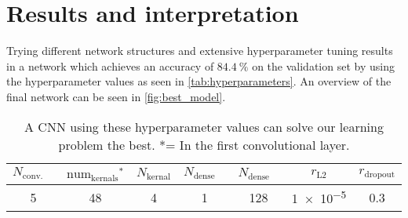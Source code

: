\section{Results and interpretation}
\label{sec:results}
Trying different network structures and extensive hyperparameter tuning results in a network which achieves an accuracy of $\SI{84.4}{\percent}$ on the validation set by using the
hyperparameter values as seen in \autoref{tab:hyperparameters}.
An overview of the final network can be seen in \autoref{fig:best_model}.
\begin{table}
    \centering
    \caption{A CNN using these hyperparameter values can solve our learning problem the best. *= In the first convolutional layer.}
    \label{tab:hyperparameters}
    \begin{tabular}{c c c c c c c}
        \toprule
        $N_\text{conv. layers}$ & ${\text{num}_\text{kernals}}^*$ & $N_\text{kernal}$ & $N_\text{dense layers}$ & $N_\text{dense nodes}$ & $r_\text{L2}$ & $r_\text{dropout}$ \\
        \midrule
        5 & 48 & 4 & 1 & 128 & \num{1e-5} & 0.3\\
        \bottomrule
    \end{tabular}
\end{table}

